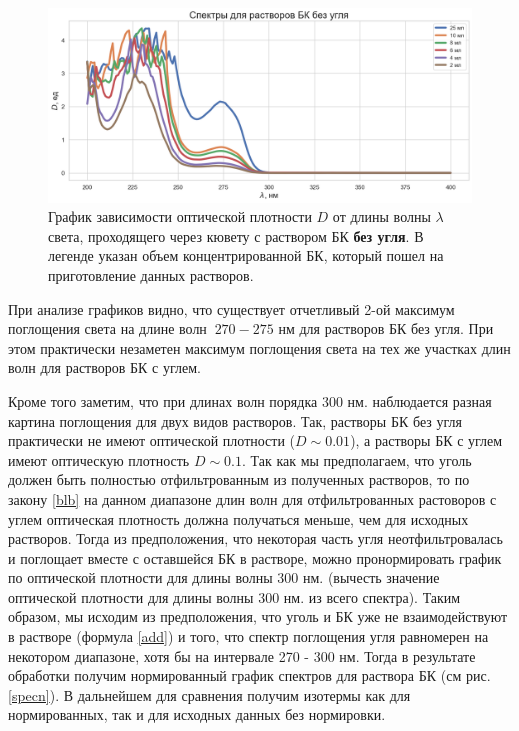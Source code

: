 \documentclass[a4paper,12pt]{article} %
\begin{document}
\begin{figure}[H]
    \includegraphics[width=18cm]{spectr.png}
    \caption{График зависимости оптической плотности $D$ от длины волны $\lambda$ света, проходящего через кювету с раствором БК \textbf{без угля}. В легенде указан объем концентрированной БК, который пошел на приготовление данных растворов.}
    \label{spec}
\end{figure}


При анализе графиков видно, что существует отчетливый 2-ой максимум поглощения света на длине волн $~270-275$ нм для растворов БК без угля. При этом практически незаметен максимум поглощения света на тех же участках длин волн для растворов БК с углем. 
\par
Кроме того заметим, что при длинах волн порядка 300 нм. наблюдается разная картина поглощения для двух видов растворов. Так, растворы БК без угля практически не имеют оптической плотности ($D\sim0.01$), а растворы БК с углем имеют оптическую плотность $D\sim0.1$. Так как мы предполагаем, что уголь должен быть полностью отфильтрованным из полученных растворов, то по закону \eqref{blb} на данном диапазоне длин волн для отфильтрованных растоворов с углем оптическая плотность должна получаться меньше, чем для исходных растворов. Тогда из предположения, что некоторая часть угля неотфильтровалась и поглощает вместе с оставшейся БК в растворе, можно пронормировать график по оптической плотности для длины волны 300 нм. (вычесть значение оптической плотности для длины волны 300 нм. из всего спектра). Таким образом, мы исходим из предположения, что уголь и БК уже не взаимодействуют в растворе (формула \eqref{add}) и того, что спектр поглощения угля равномерен на некотором диапазоне, хотя бы на интервале 270 - 300 нм. Тогда в результате обработки получим нормированный график спектров для раствора БК (см рис. \ref{specn}). В дальнейшем для сравнения получим изотермы как для нормированных, так и для исходных данных без нормировки.
\end{document}
